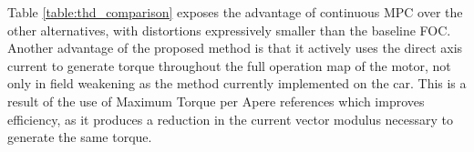 \documentclass[9pt,conference]{IEEEtran}
\begin{document}
\begin{table}[htb]
	\caption{Control Method Current THD comparison. THD is calculated until the Nyquist frequency, that is $250kHz$ and $40kHz$ for the controllers running at $50kHz$ and $8kHz$ respectively.}
	\label{table:thd_comparison}%
	\renewcommand{\arraystretch}{1.2} %
		\centering
\end{table}

Table \ref{table:thd_comparison} exposes the advantage of continuous MPC over the other alternatives, with distortions expressively smaller than the baseline FOC. Another advantage of the proposed method is that it actively uses the direct axis current to generate torque throughout the full operation map of the motor,  not only in field weakening as the method currently implemented on the car. This is a result of the use of Maximum Torque per Apere references which improves efficiency, as it produces a reduction in the current vector modulus necessary to generate the same torque.
\end{document}
